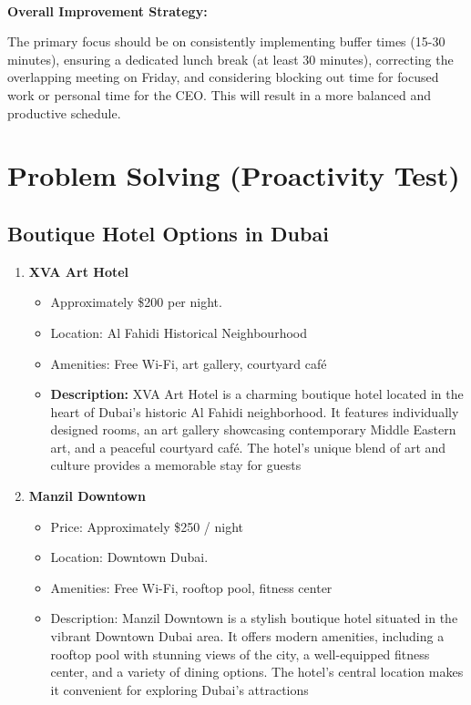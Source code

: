 \documentclass{article}
\begin{document}
\\
\textbf{Overall Improvement Strategy:}

The primary focus should be on consistently implementing buffer times (15-30 minutes), ensuring a dedicated lunch break (at least 30 minutes), correcting the overlapping meeting on Friday, and considering blocking out time for focused work or personal time for the CEO. This will result in a more balanced and productive schedule.
\vfill







\newpage
\section{Problem Solving (Proactivity Test)}

\subsection{Boutique Hotel Options in Dubai}

\begin{enumerate}
    \item \textbf{XVA Art Hotel}
    \begin{itemize}
        \item Approximately \$200 per night.
        \item Location: Al Fahidi Historical Neighbourhood 
        \item Amenities: Free Wi-Fi, art gallery, courtyard café
        \item \textbf{Description:} XVA Art Hotel is a charming boutique hotel located in the heart of Dubai's historic Al Fahidi neighborhood. It features individually designed rooms, an art gallery showcasing contemporary Middle Eastern art, and a peaceful courtyard café. The hotel's unique blend of art and culture provides a memorable stay for guests
    \end{itemize}
    \item \textbf{Manzil Downtown}
    \begin{itemize}
        \item Price: Approximately \$250 / night
        \item Location: Downtown Dubai.
        \item Amenities: Free Wi-Fi, rooftop pool, fitness center
        \item Description: Manzil Downtown is a stylish boutique hotel situated in the vibrant Downtown Dubai area. It offers modern amenities, including a rooftop pool with stunning views of the city, a well-equipped fitness center, and a variety of dining options. The hotel's central location makes it convenient for exploring Dubai's attractions
    \end{itemize}
\end{enumerate}
\end{document}
